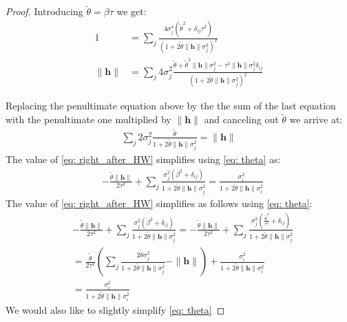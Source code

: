 \documentclass[conference]{IEEEtran}
\begin{document}
\begin{proof}
Introducing $\tilde{\theta}= \beta\tau$ we get:
\begin{align*}
1 &=  \sum_j \frac{4\sigma_j^4(\tilde{\theta}^2 + \delta_{ij}\tau^2)}{(1 + 2\tilde{\theta}\|\mathbf{h}\|\sigma_j^2)^2} \\
\|\mathbf{h}\| &= \sum_j 4 \sigma_j^2 \frac{\tilde{\theta} + \tilde{\theta}^2\|\mathbf{h}\|\sigma_j^2 - \tau^2 \|\mathbf{h}\|\sigma_j^2 \delta_{ij}}{(1 + 2\tilde{\theta}\|\mathbf{h}\|\sigma_j^2)^2} \nonumber
\end{align*}

Replacing the penultimate equation above by the the sum of the last equation with the penultimate one multiplied by $\|\mathbf{h}\|$ and canceling out $\tilde{\theta}$ we arrive at:
\begin{align}\label{eq: theta}
\sum_j 2 \sigma_j^2 \frac{\tilde{\theta}}{1 + 2\tilde{\theta}\|\mathbf{h}\|\sigma_j^2} = \|\mathbf{h}\| 
\end{align}
The value of \eqref{eq: right_after_HW} simplifies using \eqref{eq: theta} as:
\begin{align*}
&- \frac{\tilde{\theta}\|\mathbf{h}\|}{2\tau^2} +  \sum_j \frac{\sigma_j^2(\beta^2 + \delta_{ij})}{1 + 2\tilde{\theta}\|\mathbf{h}\|\sigma_j^2} = \frac{\sigma_i^2}{1 + 2\tilde{\theta}\|\mathbf{h}\|\sigma_i^2}
\end{align*}
The value of \eqref{eq: right_after_HW} simplifies as follows using \eqref{eq: theta}:
\begin{align*}
&- \frac{\tilde{\theta}\|\mathbf{h}\|}{2\tau^2} +  \sum_j \frac{\sigma_j^2(\beta^2 + \delta_{ij})}{1 + 2\tilde{\theta}\|\mathbf{h}\|\sigma_j^2} = - \frac{\tilde{\theta}\|\mathbf{h}\|}{2\tau^2} +  \sum_j \frac{\sigma_j^2(\frac{\tilde{\theta}^2}{\tau^2} + \delta_{ij})}{1 + 2\tilde{\theta}\|\mathbf{h}\|\sigma_j^2 } \\
&=   \frac{\tilde{\theta}}{2\tau^2} \left( \sum_j \frac{2\tilde{\theta} \sigma_j^2}{1 + 2\tilde{\theta}\|\mathbf{h}\|\sigma_j^2 } -\|\mathbf{h}\| \right) +   \frac{\sigma_i^2}{1 + 2\tilde{\theta}\|\mathbf{h}\|\sigma_i^2}\\ & = \frac{\sigma_i^2}{1 + 2\tilde{\theta}\|\mathbf{h}\|\sigma_i^2}
\end{align*}
We would also like to slightly simplify \eqref{eq: theta}

\end{proof}
\end{document}
